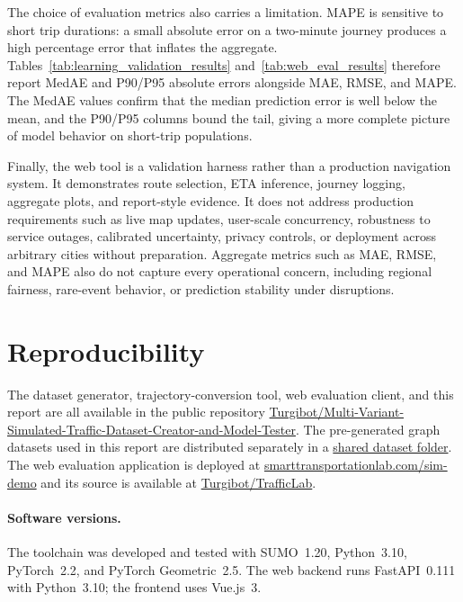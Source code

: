 The choice of evaluation metrics also carries a limitation. MAPE is sensitive to short trip durations: a small absolute error on a two-minute journey produces a high percentage error that inflates the aggregate. Tables~\ref{tab:learning_validation_results} and~\ref{tab:web_eval_results} therefore report MedAE and P90/P95 absolute errors alongside MAE, RMSE, and MAPE. The MedAE values confirm that the median prediction error is well below the mean, and the P90/P95 columns bound the tail, giving a more complete picture of model behavior on short-trip populations.

Finally, the web tool is a validation harness rather than a production navigation system. It demonstrates route selection, ETA inference, journey logging, aggregate plots, and report-style evidence. It does not address production requirements such as live map updates, user-scale concurrency, robustness to service outages, calibrated uncertainty, privacy controls, or deployment across arbitrary cities without preparation. Aggregate metrics such as MAE, RMSE, and MAPE also do not capture every operational concern, including regional fairness, rare-event behavior, or prediction stability under disruptions.

\section{Reproducibility}
The dataset generator, trajectory-conversion tool, web evaluation client, and this report are all available in the public repository \href{https://github.com/Turgibot/Multi-Variant-Simulated-Traffic-Dataset-Creator-and-Model-Tester}{Turgibot/Multi-Variant-Simulated-Traffic-Dataset-Creator-and-Model-Tester}. The pre-generated graph datasets used in this report are distributed separately in a \href{https://drive.google.com/drive/folders/1baEONbv8WyDVanF_qvLCq1UJ4oT5N7LE?usp=sharing}{shared dataset folder}. The web evaluation application is deployed at \href{https://smarttransportationlab.com/sim-demo}{smarttransportationlab.com/sim-demo} and its source is available at \href{https://github.com/Turgibot/TrafficLab}{Turgibot/TrafficLab}.

\paragraph{Software versions.}
\begin{sloppypar}
The toolchain was developed and tested with SUMO~1.20, Python~3.10, PyTorch~2.2, and PyTorch Geometric~2.5. The web backend runs FastAPI~0.111 with Python~3.10; the frontend uses Vue.js~3.
\end{sloppypar}


